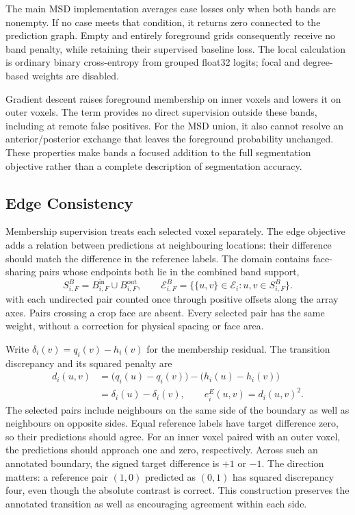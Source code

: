 \documentclass[12pt,a4paper]{article}
\begin{document}
The main MSD implementation averages case losses only when both bands
are nonempty. If no case meets that condition, it returns zero connected
to the prediction graph. Empty and entirely foreground grids consequently
receive no band penalty, while retaining their supervised baseline loss.
The local calculation is ordinary binary cross-entropy from grouped
float32 logits; focal and degree-based weights are disabled.

Gradient descent raises foreground membership on inner voxels and lowers
it on outer voxels. The term provides no direct supervision outside
these bands, including at remote false positives. For the MSD union,
it also cannot resolve an anterior/posterior exchange that leaves the
foreground probability unchanged. These properties make bands a focused
addition to the full segmentation objective rather than a complete
description of segmentation accuracy.

\subsection{Edge Consistency}\label{sec:edge-constraints}

Membership supervision treats each selected voxel separately. The edge
objective adds a relation between predictions at neighbouring locations:
their difference should match the difference in the reference labels.
The domain contains face-sharing pairs whose endpoints both lie in the
combined band support,
\begin{equation}
S_{i,F}^{B}=B_{i,F}^{\mathrm{in}}\cup B_{i,F}^{\mathrm{out}},
\qquad
\mathcal{E}_{i,F}^{B}
=\bigl\{\{u,v\}\in\mathcal{E}_i:
          u,v\in S_{i,F}^{B}\bigr\}.
\label{eq:edge-supported-pairs}
\end{equation}
with each undirected pair counted once through positive offsets along
the array axes. Pairs crossing a crop face are absent. Every selected
pair has the same weight, without a correction for physical spacing or
face area.

Write $\delta_i(v)=q_i(v)-h_i(v)$ for the membership residual. The
transition discrepancy and its squared penalty are
\begin{equation}
\begin{aligned}
d_i(u,v)
 &=\bigl(q_i(u)-q_i(v)\bigr)
   -\bigl(h_i(u)-h_i(v)\bigr)\\
 &=\delta_i(u)-\delta_i(v),
\qquad e_i^{E}(u,v)=d_i(u,v)^2.
\end{aligned}
\label{eq:edge-transition-discrepancy}
\end{equation}
The selected pairs include neighbours on the same side of the boundary
as well as neighbours on opposite sides. Equal reference labels have
target difference zero, so their predictions should agree. For an inner
voxel paired with an outer voxel, the predictions should approach one
and zero, respectively. Across such an annotated boundary, the signed
target difference is $+1$ or $-1$. The direction matters: a
reference pair $(1,0)$ predicted as $(0,1)$ has squared discrepancy four,
even though the absolute contrast is correct. This construction preserves
the annotated transition as well as encouraging agreement within each
side.
\end{document}
